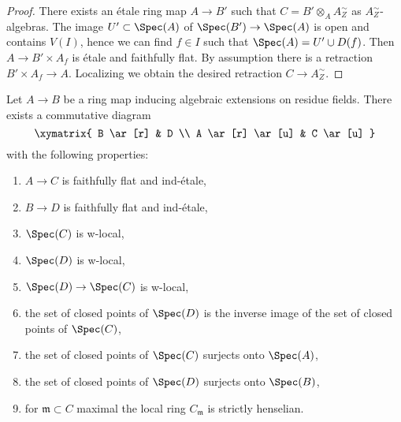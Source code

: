 \begin{proof}
There exists an \'etale ring map $A \to B'$ such that
$C = B' \otimes_A A_Z^\sim$ as $A_Z^\sim$-algebras.
The image $U' \subset \Spec(A)$ of $\Spec(B') \to \Spec(A)$
is open and contains $V(I)$, hence we can find $f \in I$ such
that $\Spec(A) = U' \cup D(f)$. Then $A \to B' \times A_f$
is \'etale and faithfully flat. By assumption there is a retraction
$B' \times A_f \to A$. Localizing we obtain the desired retraction
$C \to A_Z^\sim$.
\end{proof}

\begin{lemma}
\label{lemma-get-w-local-algebraic-residue-field-extensions}
Let $A \to B$ be a ring map inducing algebraic extensions on residue fields.
There exists a commutative diagram
$$
\xymatrix{
B \ar[r] & D \\
A \ar[r] \ar[u] & C \ar[u]
}
$$
with the following properties:
\begin{enumerate}
\item $A \to C$ is faithfully flat and ind-\'etale,
\item $B \to D$ is faithfully flat and ind-\'etale,
\item $\Spec(C)$ is w-local,
\item $\Spec(D)$ is w-local,
\item $\Spec(D) \to \Spec(C)$ is w-local,
\item the set of closed points of $\Spec(D)$ is the inverse image
of the set of closed points of $\Spec(C)$,
\item the set of closed points of $\Spec(C)$ surjects onto $\Spec(A)$,
\item the set of closed points of $\Spec(D)$ surjects onto $\Spec(B)$,
\item for $\mathfrak m \subset C$ maximal the local ring
$C_\mathfrak m$ is strictly henselian.
\end{enumerate}
\end{lemma}

